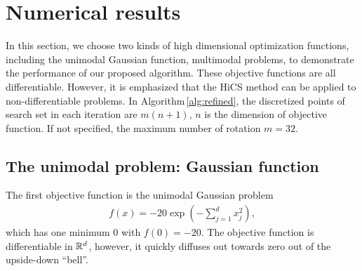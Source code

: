 

\section{Numerical results}
\label{sec:experiment}

In this section, we choose two kinds of high dimensional optimization functions,
including the unimodal Gaussian function, multimodal problems,
to demonstrate the performance of our proposed algorithm. 
These objective functions are all differentiable. However, it is
emphasized that the HiCS method can be applied to non-differentiable problems. 
In Algorithm\,\ref{alg:refined}, the discretized points of 
search set in each iteration are $m(n+1)$, $n$ is the dimension
of objective function. If not specified, the maximum number of
rotation $m=32$.

\subsection{The unimodal problem: Gaussian function}
\label{subsec:gauss}

The first objective function is the unimodal Gaussian problem
\begin{align}
	f(x) = -20\exp\left(-\sum_{j=1}^d x_j^2 \right),
	\label{eqn:exp1}
\end{align}
which has one minimum $0$ with $f(0)=-20$.
The objective function is differentiable in $\mathbb{R}^d$, however,
it quickly diffuses out towards zero out of the upside-down ``bell''. 

